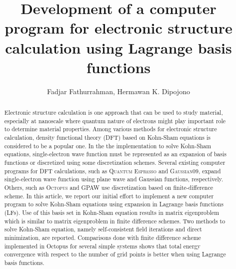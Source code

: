 \documentclass[reprint, floatfix, amsmath, amssymb, aps]{revtex4-1}
\begin{document}
\title{Development of a computer program for electronic structure calculation using Lagrange basis functions}
\author{Fadjar Fathurrahman, Hermawan K. Dipojono}

\begin{abstract}
Electronic structure calculation is one approach that can be used to study material,
especially at nanoscale where quantum nature of electrons might play important role
to determine material properties. Among various methods for electronic structure calculation,
density functional theory (DFT) based on Kohn-Sham equations is considered to be a popular one.
In the the implementation to solve Kohn-Sham equations, single-electron wave function must be
represented as an expansion of basis functions or discretized using
some discretization schemes. Several
existing computer programs for DFT calculations, such as
\textsc{Quantum Espresso} and \textsc{Gaussian09},
expand single-electron wave function using plane wave and Gaussian functions, respectively.
Others, such as \textsc{Octopus} and GPAW use discretization based on finite-difference scheme.
In this article, we report our initial effort to implement a new computer program to
solve Kohn-Sham equations using expansion in Lagrange basis functions (LFs).
Use of this basis set in Kohn-Sham equation results in matrix eigenproblem which
is similar to matrix eigenproblem in finite difference schemes. Two methods to solve
Kohn-Sham equation, namely self-consistent field iterations and direct minimization,
are reported. Comparisons done with finite difference scheme implemented in Octopus
for several simple systems shows that total energy convergence with respect to the number
of grid points is better when using Lagrange basis functions.
\end{abstract}

\maketitle











\end{document}

